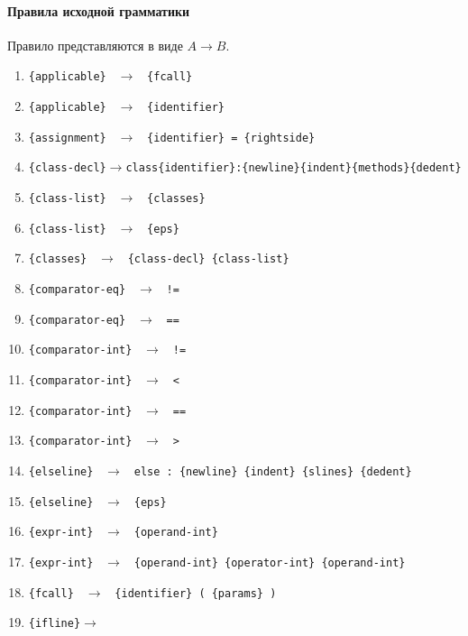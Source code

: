 \documentclass[a4paper,10pt,notitlepage,pdftex]{scrreprt}
\begin{document}
        \paragraph{Правила исходной грамматики}
        \label{para:rules}
            Правило представляются в виде $A \rightarrow B$.
            \begin{enumerate}
                \item \verb'{applicable} ' $\rightarrow$ \verb' {fcall}'
                \item \verb'{applicable} ' $\rightarrow$ \verb' {identifier}'


                \item \verb'{assignment} ' $\rightarrow$ \verb' {identifier} = {rightside}'
                \item \verb'{class-decl}'$\rightarrow$\verb'class{identifier}:{newline}{indent}{methods}{dedent}'
                \item \verb'{class-list} ' $\rightarrow$ \verb' {classes}'
                \item \verb'{class-list} ' $\rightarrow$ \verb' {eps}'
                \item \verb'{classes} ' $\rightarrow$ \verb' {class-decl} {class-list}'
                \item \verb'{comparator-eq} ' $\rightarrow$ \verb' !='
                \item \verb'{comparator-eq} ' $\rightarrow$ \verb' =='
                \item \verb'{comparator-int} ' $\rightarrow$ \verb' !='
                \item \verb'{comparator-int} ' $\rightarrow$ \verb' <'
                \item \verb'{comparator-int} ' $\rightarrow$ \verb' =='
                \item \verb'{comparator-int} ' $\rightarrow$ \verb' >'
                \item \verb'{elseline} ' $\rightarrow$ \verb' else : {newline} {indent} {slines} {dedent}'
                \item \verb'{elseline} ' $\rightarrow$ \verb' {eps}'
                \item \verb'{expr-int} ' $\rightarrow$ \verb' {operand-int}'
                \item \verb'{expr-int} ' $\rightarrow$ \verb' {operand-int} {operator-int} {operand-int}'
                \item \verb'{fcall} ' $\rightarrow$ \verb' {identifier} ( {params} )'
                \item \verb'{ifline}'$\rightarrow$


\end{enumerate}
\end{document}
